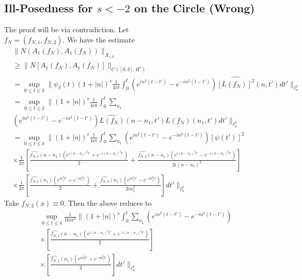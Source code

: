 \documentclass[12pt,reqno]{amsart}
\numberwithin{equation}{section}  %
\newcommand{\wh}{\widehat}
\begin{document}
\subsection{Ill-Posedness for $s < -2$ on the Circle (Wrong)} 
\label{ssec:circle-ill-pos}
%
The proof will be via contradiction. Let \\ $f_{N} = (f_{N,1},
f_{N,2})$. We have the estimate
%
%
\begin{equation*}
\begin{split}
  & \| N(A_{1}(f_{N}), A_{1}(f_{N})) \|_{X_{s,b}}
  \\
  & \ge
  \| N[A_{1}(f_{N}), A_{1}(f_{N})] \|_{C([0, \delta],
  H^{s})} 
  \\
  & = \sup_{0 \le t \le \delta} \| \psi_{\delta}(t) (1 + | n |)^{s}
  \frac{1}{4 i \pi}
  \int_{0}^{t} \left( e^{in^{2}(t-t')} - e^{-in^{2}(t-t')} \right)
  \wh{[L(f_{N})]^{2}}(n, t') dt' \|_{\ell^{2}_{n}}
  \\
  & = \sup_{0 \le t \le \delta} \| (1 + | n |)^{s} \frac{1}{4 i \pi} 
  \int_{0}^{t} \sum_{n_{1}}
  \\
  & \left( e^{in^{2}(t-t')} - e^{-in^{2}(t-t')} \right)
  \wh{L(f_{N})}(n - n_{1}, t')\wh{L(f_{N})}(n_{1}, t') dt'
  \|_{\ell^{2}_{n}}
  \\
  & = \sup_{0 \le t \le \delta} \| (1 + | n |)^{s} \frac{1}{4 i \pi} 
  \int_{0}^{t} \sum_{n_{1}} \left( e^{in^{2}(t-t')} - e^{-in^{2}(t-t')} \right)
  [\psi(t')]^{2}
  \\
  & \times \frac{1}{2 \pi} \left[ \frac{\wh{f_{N,1}}(n - n_{1})\left( e^{i(n - n_{1})^{2}t'} +
  e^{-i(n - n_{1})^{2}t'} \right)}{2} + \frac{\wh{f_{N,2}}(n - n_{1})\left(
  e^{i(n - n_{1})^{2}t'} - e^{-i(n - n_{1})^{2}t'}
  \right)}{2i(n - n_{1})^{2}} \right]
  \\
  & \times \frac{1}{2 \pi} \left[ \frac{\wh{f_{N,1}}(n_{1})\left( e^{in_{1}^{2}t'} +
  e^{-in_{1}^{2}t'} \right)}{2} + \frac{\wh{f_{N,2}}(n_{1})\left(
  e^{in_{1}^{2}t'} - e^{-in_{1}^{2}t'}
  \right)}{2 i n_{1}^{2}} \right]
  dt' \|_{\ell^{2}_{n}}
\end{split}
\end{equation*}
%
Take $f_{N,2}(x) \equiv 0$. Then the above reduces to
%
%
\begin{equation*}
\begin{split}
  & \sup_{0 \le t \le \delta} \frac{1}{16 i \pi^{2}}\| (1 + | n |)^{s}
  \int_{0}^{t} \sum_{n_{1}} \left( e^{in^{2}(t-t')} - e^{-in^{2}(t-t')} \right)
  \\
  & \times \left[ \frac{\wh{f_{N,1}}(n - n_{1})\left( e^{i(n - n_{1})^{2}t'} +
  e^{-i(n - n_{1})^{2}t'} \right)}{2} \right ]
  \\
  & \times \left[ \frac{\wh{f_{N,1}}(n_{1})\left( e^{in_{1}^{2}t'} +
  e^{-in_{1}^{2}t'} \right)}{2}  \right]
  dt' \|_{\ell^{2}_{n}}
\end{split}
\end{equation*}
\end{document}
